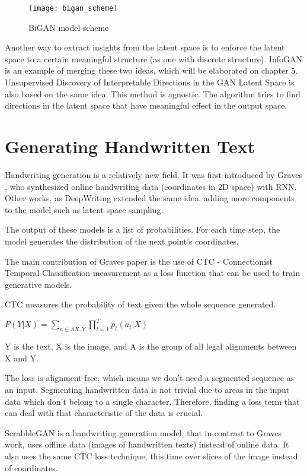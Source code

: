 \begin{figure}[h]
\centering
\texttt{[image: bigan\_scheme]}
\caption{BiGAN model scheme \cite{12}}
\label{fig:x cubed graph}
\end{figure}


Another way to extract insights from the latent space is to enforce the latent space to a certain meaningful structure (as one with discrete structure).
InfoGAN \cite{12} is an example of merging these two ideas, which will be elaborated on chapter 5. 
Unsupervised Discovery of Interpretable Directions in the GAN Latent Space is also based on the same idea. This method is agnostic. The algorithm tries to find directions in the latent space that have meaningful effect in the output space.


\section{Generating Handwritten Text}

Handwriting generation is a relatively new field. It was first introduced by Graves \cite{3}, who synthesized online handwriting data (coordinates in 2D space) with RNN. Other works, as DeepWriting \cite{4} extended the same idea, adding more components to the model such as latent space sampling.

The output of these models is a list of probabilities. For each time step, the model generates the  distribution of the next point's coordinates.

The main contribution of Graves paper is the use of CTC - Connectionist Temporal Classification \cite{5} measurement as a loss function that can be used to train generative models. 

CTC measures the probability of text given the whole sequence generated. 
\centerline{$ P(Y|X) = \sum_{a\in A{X,Y}}\prod_{t=1}^{T}p_{t}(a_{t}|X) $} 
Y is the text, X is the image, and A is the group of all legal alignments between X and Y. 

The loss is alignment free, which means we don't need a segmented sequence as an input. Segmenting handwritten data is not trivial due to areas in the input data which don't belong to a single character. Therefore, finding a loss term that can deal with that characteristic of the data is crucial.

ScrabbleGAN \cite{6} is a handwriting generation model, that in contrast to Graves work, uses offline data (images of handwritten texts) instead of online data.
It also uses the same CTC loss technique, this time over slices of the image instead of coordinates.
